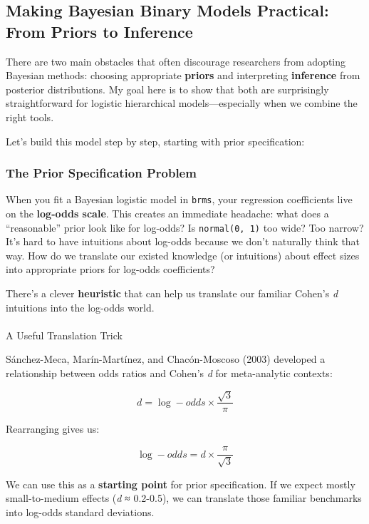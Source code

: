 \documentclass[
  letterpaper,
  DIV=11,
  numbers=noendperiod]{scrartcl}
\makeatletter
\let\oldparagraph\paragraph
\renewcommand{\paragraph}{
    \@ifstar
      \xxxParagraphStar
      \xxxParagraphNoStar
  }
\newcommand{\xxxParagraphStar}[1]{\oldparagraph*{#1}\mbox{}}
\newcommand{\xxxParagraphNoStar}[1]{\oldparagraph{#1}\mbox{}}
\makeatother
\begin{document}
\subsection{Making Bayesian Binary Models Practical: From Priors to
Inference}\label{making-bayesian-binary-models-practical-from-priors-to-inference}

There are two main obstacles that often discourage researchers from
adopting Bayesian methods: choosing appropriate \textbf{priors} and
interpreting \textbf{inference} from posterior distributions. My goal
here is to show that both are surprisingly straightforward for logistic
hierarchical models---especially when we combine the right tools.

Let's build this model step by step, starting with prior specification:

\subsubsection{The Prior Specification
Problem}\label{the-prior-specification-problem}

When you fit a Bayesian logistic model in \texttt{brms}, your regression
coefficients live on the \textbf{log-odds scale}. This creates an
immediate headache: what does a ``reasonable'' prior look like for
log-odds? Is \texttt{normal(0,\ 1)} too wide? Too narrow? It's hard to
have intuitions about log-odds because we don't naturally think that
way. How do we translate our existed knowledge (or intuitions) about
effect sizes into appropriate priors for log-odds coefficients?

There's a clever \textbf{heuristic} that can help us translate our
familiar Cohen's \emph{d} intuitions into the log-odds world.

\paragraph{A Useful Translation Trick}\label{a-useful-translation-trick}

Sánchez-Meca, Marín-Martínez, and Chacón-Moscoso (2003) developed a
relationship between odds ratios and Cohen's \emph{d} for meta-analytic
contexts:

\[d = \log-odds \times \frac{\sqrt{3}}{\pi}\]

Rearranging gives us:

\[\log-odds = d \times \frac{\pi}{\sqrt{3}}\]

We can use this as a \textbf{starting point} for prior specification. If
we expect mostly small-to-medium effects (\emph{d} ≈ 0.2-0.5), we can
translate those familiar benchmarks into log-odds standard deviations.
\end{document}
